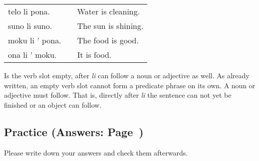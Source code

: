 \begin{supertabular}{p{5cm}|ll}
    telo li pona.   &  & Water is cleaning.  \\
    suno li suno.   &  & The sun is shining. \\
    moku li ' pona. &  & The food is good.   \\
    ona li ' moku.  &  & It is food.         \\
\end{supertabular}

Is the verb slot empty, after \textit{li} can follow a noun or adjective as well.
As already written, an empty verb slot cannot form a predicate phrase on its own.
A noun or adjective must follow.
That is, directly after \textit{li} the sentence can not yet be finished or an object can follow.

%
\newpage
\subsection*{Practice (Answers: Page~\pageref{'basic_sentences'})}
%
Please write down your answers and check them afterwards.

